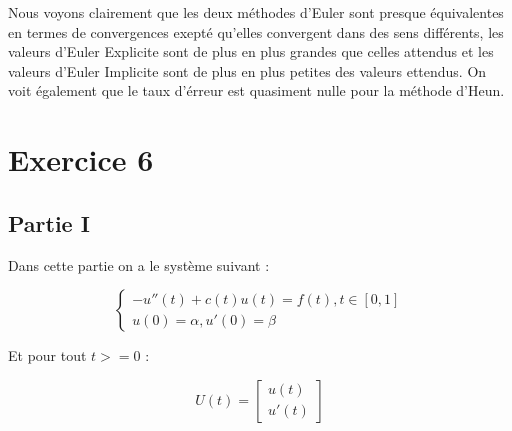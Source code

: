 \documentclass[12pt, letterpaper]{article}
\begin{document}
\begin{enumerate}
\begin{enumerate}
  Nous voyons clairement que les deux méthodes d'Euler sont presque
  équivalentes en termes de convergences exepté qu'elles convergent
  dans des sens différents, les valeurs d'Euler Explicite sont de plus
  en plus grandes que celles attendus et les valeurs d'Euler Implicite
  sont de plus en plus petites des valeurs ettendus.
  On voit également que le taux d'érreur est quasiment nulle pour la
  méthode d'Heun.
\end{enumerate}

\end{enumerate}

\section*{Exercice 6}

\subsection*{Partie I}

Dans cette partie on a le système suivant :

\begin{equation*}
  \left\{
  \begin{array}{l}
    -u''(t) + c(t)u(t) = f(t),  t \in [0,1] \\
    u(0) = \alpha, u'(0) = \beta
  \end{array}
  \right.
\end{equation*}

Et pour tout $t >= 0$ :

\begin{equation*}
  U(t) = \left[
  \begin{array}{l}
    u(t) \\
    u'(t)
  \end{array}
  \right]
\end{equation*}
\end{document}
